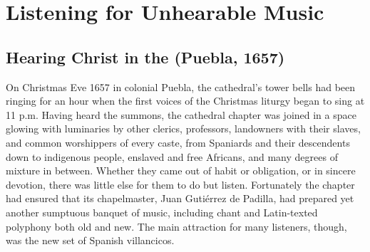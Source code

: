 
% 
% 

\part{Listening for Unhearable Music}
\label{part:unhearable-music}

\chapter[Hearing Christ]
{Hearing Christ in the  
(Puebla, 1657)}
\label{ch:padilla-voces}

On Christmas Eve 1657 in colonial Puebla, the cathedral's tower bells had been
ringing for an hour when the first voices of the Christmas liturgy began to sing
at 11 p.m.
Having heard the summons, the cathedral chapter was joined in a space glowing
with luminaries by other clerics, professors, landowners with their slaves, and
common worshippers of every caste, from Spaniards and their descendents down to
indigenous people, enslaved and free Africans, and many degrees of mixture in
between.
Whether they came out of habit or obligation, or in sincere devotion, there was
little else for them to do but listen.
Fortunately the chapter had ensured that its chapelmaster, Juan Gutiérrez de
Padilla, had prepared yet another sumptuous banquet of music, including chant
and Latin-texted polyphony both old and new.
The main attraction for many listeners, though, was the new set of Spanish
villancicos.


